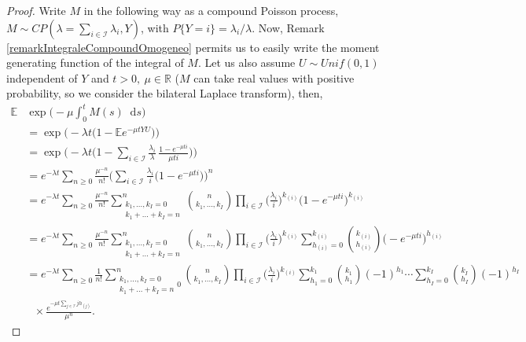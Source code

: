 \documentclass[12pt, twoside, english, headsepline]{article}
\newcommand*\dif{\mathop{}\!\mathrm{d}}  %
\theoremstyle{definition} %
\numberwithin{equation}{section} %
\begin{document}
\begin{proof}
Write $M$ in the following way as a compound Poisson process, $M\sim CP( \lambda = \sum_{i\in\mathcal{I}} \lambda_i, Y)$, with $P\{Y = i\} = \lambda_i/\lambda$. Now, Remark \ref{remarkIntegraleCompoundOmogeneo} permits us to easily write the moment generating function of the integral of $M$. Let us also assume  $U\sim Unif(0,1)$ independent of $Y$ and $t>0,\ \mu\in\mathbb{R}$ ($M$ can take real values with positive probability, so we consider the bilateral Laplace transform), then,
\begin{align}
	\mathbb{E}&\exp\bigg( -\mu \int_0^t M(s)\dif s\bigg) \nonumber\\
	& = \exp\bigg(-\lambda t\big(1-\mathbb{E}e^{-\mu t YU}\big)\bigg)\nonumber \\
	& = \exp\Bigg(-\lambda t \bigg(1- \sum_{i\in\mathcal{I}}\frac{\lambda_i}{\lambda}\, \frac{1-e^{-\mu t i}}{\mu t i}\bigg) \Bigg)\nonumber\\
	& = e^{-\lambda t} \sum_{n\ge0} \frac{\mu^{-n}}{n!}  \Bigg( \sum_{i\in\mathcal{I}} \frac{\lambda_i}{i} \Big(1-e^{-\mu t i}\Big)\Bigg)^n\nonumber\\
	& = e^{-\lambda t} \sum_{n\ge0}\frac{\mu^{-n}}{n!}  \sum_{\substack{k_1,\dots,k_I=0\\k_1+\dots+k_I=n}}^n \binom{n}{k_1,\dots, k_I} \prod_{i\in\mathcal{I}} \bigg(\frac{\lambda_i}{i}\bigg)^{k_{(i)}}  \Big( 1-e^{-\mu t i}\Big)^{k_{(i)}}\nonumber\\
	& = e^{-\lambda t} \sum_{n\ge0} \frac{\mu^{-n}}{n!}  \sum_{\substack{k_1,\dots,k_I=0\\k_1+\dots+k_I=n}}^n \binom{n}{k_1,\dots, k_I} \prod_{i\in\mathcal{I}} \bigg(\frac{\lambda_i}{i}\bigg)^{k_{(i)}}  \sum_{h_{(i)} = 0}^{k_{(i)}} \binom{k_{(i)}}{h_{(i)}} \Big(-e^{-\mu t i}\Big)^{h_{(i)}} \nonumber\\
	& = e^{-\lambda t} \sum_{n\ge0} \frac{1}{n!} \sum_{\substack{k_1,\dots,k_I=0\\k_1+\dots+k_I=n}0}^n \binom{n}{k_1,\dots, k_I} \prod_{i\in\mathcal{I}} \bigg(\frac{\lambda_i}{i}\bigg)^{k_{(i)}}  \sum_{h_1 = 0}^{k_1} \binom{k_1}{h_1} (-1)^{h_1}\cdots \sum_{h_I = 0}^{k_I} \binom{k_I}{h_I} (-1)^{h_I} \nonumber\\
	&\ \ \ \times \frac{e^{-\mu t\sum_{j\in\mathcal{I}} jh_{(j)} } }{\mu^n}. \label{trasformataLaplaceIntegraleSkellamGeneralizzato}
\end{align}


\end{proof}
\end{document}
